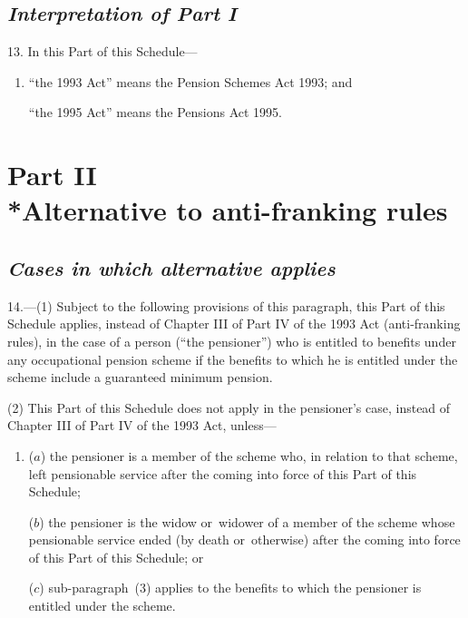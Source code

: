\documentclass[12pt,a4paper]{article}
\begin{document}

\subsection*{\itshape Interpretation of Part I}

13. In this Part of this Schedule—
\begin{enumerate}\item[]
    “the 1993 Act” means the Pension Schemes Act 1993; and

    “the 1995 Act” means the Pensions Act 1995.  
\end{enumerate}

\section[Part II --- Alternative to anti-franking rules]{Part II\\*Alternative to anti-franking rules}

\renewcommand\parthead{--- Schedule 5 Part II}


\subsection*{\itshape Cases in which alternative applies}

14.---(1) Subject to the following provisions of this paragraph, this Part of this Schedule applies, instead of Chapter III of Part IV of the 1993 Act (anti-franking rules), in the case of a person (“the pensioner”) who is entitled to benefits under any occupational pension scheme if the benefits to which he is entitled under the scheme include a guaranteed minimum pension.

(2) This Part of this Schedule does not apply in the pensioner’s case, instead of Chapter III of Part IV of the 1993 Act, unless—
\begin{enumerate}\item[]
($a$) the pensioner is a member of the scheme who, in relation to that scheme, left pensionable service after the coming into force of this Part of this Schedule;

($b$) the pensioner is the widow or~widower of a member of the scheme whose pensionable service ended (by death or~otherwise) after the coming into force of this Part of this Schedule; or

($c$) sub-paragraph~(3)  applies to the benefits to which the pensioner is entitled under the scheme.
\end{enumerate}
\end{document}
